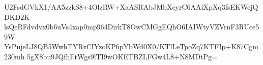 U2FsdGVkX1/AA5zzkS8+4OlzRW+XaASRAbJMbXcyrC6AAiXpXq3fsEKWcjQDKD2K
lsQeRFdvdvx0b6uVs4xap0mp964DirkT8OwCMGgEQhO6IAIWtyVZVrnF3RUce59W
YsPujeLJ8QB5WwhTYRzCIYzoKP6pYbWd0X0/KTlLeTpoZq7KTFIp+K87Cgm230mh
5gX8bu9JQfhFtWgs9lTI9wOKETBZLFGw4L8+N8MDtPg=
